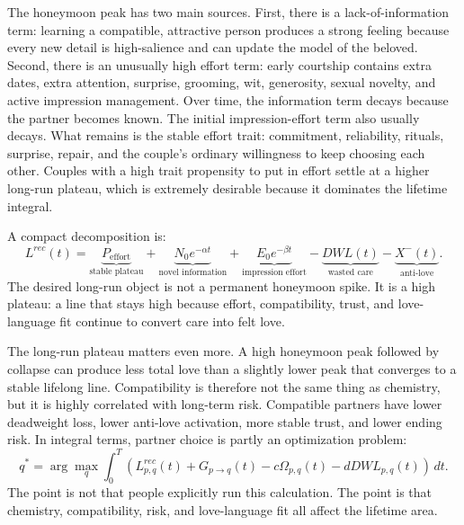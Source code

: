 \documentclass[11pt]{article}
\newcommand{\Risk}{\Omega}
\begin{document}
The honeymoon peak has two main sources. First, there is a lack-of-information term: learning a compatible, attractive person produces a strong feeling because every new detail is high-salience and can update the model of the beloved. Second, there is an unusually high effort term: early courtship contains extra dates, extra attention, surprise, grooming, wit, generosity, sexual novelty, and active impression management. Over time, the information term decays because the partner becomes known. The initial impression-effort term also usually decays. What remains is the stable effort trait: commitment, reliability, rituals, surprise, repair, and the couple's ordinary willingness to keep choosing each other. Couples with a high trait propensity to put in effort settle at a higher long-run plateau, which is extremely desirable because it dominates the lifetime integral.

A compact decomposition is:
\begin{equation}
L^{rec}(t)=\underbrace{P_{\mathrm{effort}}}_{\text{stable plateau}}+\underbrace{N_0e^{-\alpha t}}_{\text{novel information}}+\underbrace{E_0e^{-\beta t}}_{\text{impression effort}}-\underbrace{DWL(t)}_{\text{wasted care}}-\underbrace{X^-(t)}_{\text{anti-love}}.
\end{equation}
The desired long-run object is not a permanent honeymoon spike. It is a high plateau: a line that stays high because effort, compatibility, trust, and love-language fit continue to convert care into felt love.

The long-run plateau matters even more. A high honeymoon peak followed by collapse can produce less total love than a slightly lower peak that converges to a stable lifelong line. Compatibility is therefore not the same thing as chemistry, but it is highly correlated with long-term risk. Compatible partners have lower deadweight loss, lower anti-love activation, more stable trust, and lower ending risk. In integral terms, partner choice is partly an optimization problem:
\begin{equation}
q^*=\arg\max_q \int_0^T \left(L_{p,q}^{rec}(t)+G_{p\rightarrow q}(t)-c\Risk_{p,q}(t)-dDWL_{p,q}(t)\right)\,dt.
\end{equation}
The point is not that people explicitly run this calculation. The point is that chemistry, compatibility, risk, and love-language fit all affect the lifetime area.
\end{document}

